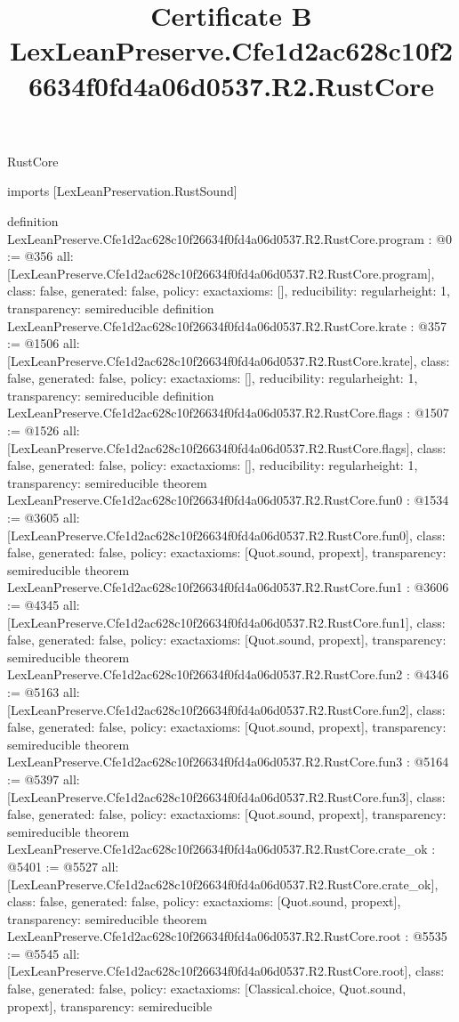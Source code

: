 \begin{lexlean}{RustCore}
\title{Certificate B LexLeanPreserve.Cfe1d2ac628c10f26634f0fd4a06d0537.R2.RustCore}
\begin{coremodule}
imports [LexLeanPreservation.RustSound]

definition LexLeanPreserve.Cfe1d2ac628c10f26634f0fd4a06d0537.R2.RustCore.program : @0 := @356 {
  all: [LexLeanPreserve.Cfe1d2ac628c10f26634f0fd4a06d0537.R2.RustCore.program],
  class: false,
  generated: false,
  policy: exact{axioms: []},
  reducibility: regular{height: 1},
  transparency: semireducible
}
definition LexLeanPreserve.Cfe1d2ac628c10f26634f0fd4a06d0537.R2.RustCore.krate : @357 := @1506 {
  all: [LexLeanPreserve.Cfe1d2ac628c10f26634f0fd4a06d0537.R2.RustCore.krate],
  class: false,
  generated: false,
  policy: exact{axioms: []},
  reducibility: regular{height: 1},
  transparency: semireducible
}
definition LexLeanPreserve.Cfe1d2ac628c10f26634f0fd4a06d0537.R2.RustCore.flags : @1507 := @1526 {
  all: [LexLeanPreserve.Cfe1d2ac628c10f26634f0fd4a06d0537.R2.RustCore.flags],
  class: false,
  generated: false,
  policy: exact{axioms: []},
  reducibility: regular{height: 1},
  transparency: semireducible
}
theorem LexLeanPreserve.Cfe1d2ac628c10f26634f0fd4a06d0537.R2.RustCore.fun0 : @1534 := @3605 {
  all: [LexLeanPreserve.Cfe1d2ac628c10f26634f0fd4a06d0537.R2.RustCore.fun0],
  class: false,
  generated: false,
  policy: exact{axioms: [Quot.sound, propext]},
  transparency: semireducible
}
theorem LexLeanPreserve.Cfe1d2ac628c10f26634f0fd4a06d0537.R2.RustCore.fun1 : @3606 := @4345 {
  all: [LexLeanPreserve.Cfe1d2ac628c10f26634f0fd4a06d0537.R2.RustCore.fun1],
  class: false,
  generated: false,
  policy: exact{axioms: [Quot.sound, propext]},
  transparency: semireducible
}
theorem LexLeanPreserve.Cfe1d2ac628c10f26634f0fd4a06d0537.R2.RustCore.fun2 : @4346 := @5163 {
  all: [LexLeanPreserve.Cfe1d2ac628c10f26634f0fd4a06d0537.R2.RustCore.fun2],
  class: false,
  generated: false,
  policy: exact{axioms: [Quot.sound, propext]},
  transparency: semireducible
}
theorem LexLeanPreserve.Cfe1d2ac628c10f26634f0fd4a06d0537.R2.RustCore.fun3 : @5164 := @5397 {
  all: [LexLeanPreserve.Cfe1d2ac628c10f26634f0fd4a06d0537.R2.RustCore.fun3],
  class: false,
  generated: false,
  policy: exact{axioms: [Quot.sound, propext]},
  transparency: semireducible
}
theorem LexLeanPreserve.Cfe1d2ac628c10f26634f0fd4a06d0537.R2.RustCore.crate_ok : @5401 := @5527 {
  all: [LexLeanPreserve.Cfe1d2ac628c10f26634f0fd4a06d0537.R2.RustCore.crate_ok],
  class: false,
  generated: false,
  policy: exact{axioms: [Quot.sound, propext]},
  transparency: semireducible
}
theorem LexLeanPreserve.Cfe1d2ac628c10f26634f0fd4a06d0537.R2.RustCore.root : @5535 := @5545 {
  all: [LexLeanPreserve.Cfe1d2ac628c10f26634f0fd4a06d0537.R2.RustCore.root],
  class: false,
  generated: false,
  policy: exact{axioms: [Classical.choice, Quot.sound, propext]},
  transparency: semireducible
}


\end{coremodule}
\end{lexlean}
